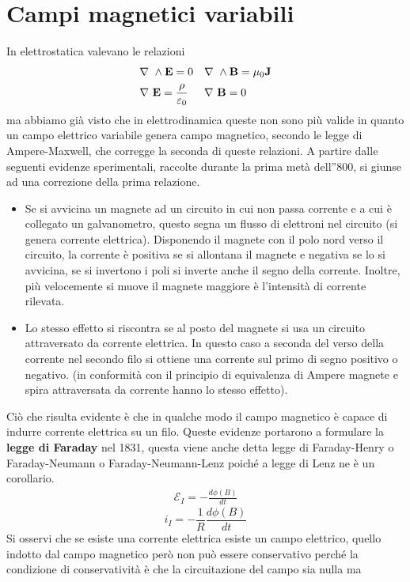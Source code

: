 \documentclass[10pt,a4paper]{article}
\def\n{\ensuremath\nabla}
\def\n{\ensuremath\nabla\ }
\begin{document}
\section{Campi magnetici variabili}
In elettrostatica valevano le relazioni
\begin{align*}
&\n\wedge\mathbf{E}=0&&\n\wedge\mathbf{B}=\mu_0\mathbf{J}\\
&\n\mathbf{E}=\frac{\rho}{\varepsilon_0}&&\n\mathbf{B}=0
\end{align*}
ma abbiamo già visto che in elettrodinamica queste non sono più valide in quanto un campo elettrico variabile genera campo magnetico, secondo le legge di Ampere-Maxwell, che corregge la seconda di queste relazioni. A partire dalle seguenti evidenze sperimentali, raccolte durante la prima metà dell''800, si giunse ad una correzione della prima relazione.\\
\begin{itemize}
	\item Se si avvicina un magnete ad un circuito in cui non passa corrente e a cui è collegato un galvanometro, questo segna un flusso di elettroni nel circuito (si genera corrente elettrica). Disponendo il magnete con il polo nord verso il circuito, la corrente è positiva se si allontana il magnete e negativa se lo si avvicina, se si invertono i poli si inverte anche il segno della corrente. Inoltre, più velocemente si muove il magnete maggiore è l'intensità di corrente rilevata.
	\item Lo stesso effetto si riscontra se al posto del magnete si usa un circuito attraversato da corrente elettrica. In questo caso a seconda del verso della corrente nel secondo filo si ottiene una corrente sul primo di segno positivo o negativo. (in conformità con il principio di equivalenza di Ampere magnete e spira attraversata da corrente hanno lo stesso effetto).
\end{itemize}
Ciò che risulta evidente è che in qualche modo il campo magnetico è capace di indurre corrente elettrica su un filo. Queste evidenze portarono a formulare la \textbf{legge di Faraday} nel 1831, questa viene anche detta legge di Faraday-Henry o Faraday-Neumann o Faraday-Neumann-Lenz poiché a legge di Lenz ne è un corollario.
\begin{align}\label{eq:Faraday_integrale}
	\mathcal{E}_I = -\frac{d\phi(B)}{dt}
\end{align}
\[i_I = -\frac{1}{R}\frac{d\phi(B)}{dt}\]
Si osservi che se esiste una corrente elettrica esiste un campo elettrico, quello indotto dal campo magnetico però non può essere conservativo perché la condizione di conservatività è che la circuitazione del campo sia nulla ma
\end{document}
